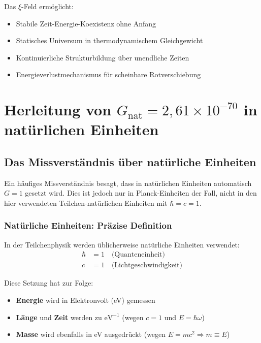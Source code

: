 \documentclass[12pt,a4paper]{article}
\theoremstyle{definition}
\begin{document}
	Das $\xi$-Feld ermöglicht:
	\begin{itemize}
		\item Stabile Zeit-Energie-Koexistenz ohne Anfang
		\item Statisches Universum in thermodynamischem Gleichgewicht  
		\item Kontinuierliche Strukturbildung über unendliche Zeiten
		\item Energieverlustmechanismus für scheinbare Rotverschiebung
	\end{itemize}
\section{Herleitung von $G_{\text{nat}} = 2{,}61 \times 10^{-70}$ in natürlichen Einheiten}

\subsection{Das Missverständnis über natürliche Einheiten}

\begin{important}
	Ein häufiges Missverständnis besagt, dass in natürlichen Einheiten automatisch $G = 1$ gesetzt wird. Dies ist jedoch nur in Planck-Einheiten der Fall, nicht in den hier verwendeten Teilchen-natürlichen Einheiten mit $\hbar = c = 1$.
\end{important}

\subsubsection{Natürliche Einheiten: Präzise Definition}

In der Teilchenphysik werden üblicherweise natürliche Einheiten verwendet:
\begin{align}
	\hbar &= 1 \quad \text{(Quanteneinheit)} \\
	c &= 1 \quad \text{(Lichtgeschwindigkeit)}
\end{align}

Diese Setzung hat zur Folge:
\begin{itemize}
	\item \textbf{Energie} wird in Elektronvolt (eV) gemessen
	\item \textbf{Länge} und \textbf{Zeit} werden zu $\text{eV}^{-1}$ (wegen $c = 1$ und $E = \hbar \omega$)
	\item \textbf{Masse} wird ebenfalls in eV ausgedrückt (wegen $E = mc^2 \Rightarrow m \equiv E$)
\end{itemize}
\end{document}
